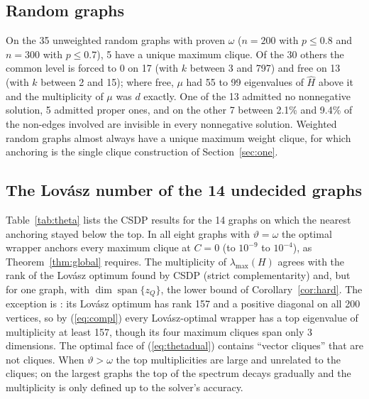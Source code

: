 \documentclass[11pt]{article}
\theoremstyle{definition}
\theoremstyle{remark}
\newcommand{\hH}{\hat{H}}
\newcommand{\lmax}{\lambda_{\max}}
\newcommand{\gr}[1]{\texttt{\detokenize{#1}}}
\DeclareMathOperator{\spn}{span}
\begin{document}
\subsection{Random graphs}

On the 35 unweighted random graphs with proven $\omega$ ($n=200$ with
$p\leq0.8$ and $n=300$ with $p\leq0.7$), 5 have a unique maximum clique. Of
the 30 others the common level is forced to $0$ on 17 (with $k$ between 3
and 797) and free on 13 (with $k$ between 2 and 15); where free, $\mu$ had
55 to 99 eigenvalues of $\hH$ above it and the multiplicity of $\mu$ was $d$
exactly. One of the 13 admitted no nonnegative solution, 5 admitted proper
ones, and on the other 7 between 2.1\% and 9.4\% of the non-edges involved
are invisible in every nonnegative solution. Weighted random graphs almost always have a unique maximum weight
clique, for which anchoring is the single clique construction of
Section~\ref{sec:one}.

\subsection{The Lov\'asz number of the 14 undecided graphs}

Table~\ref{tab:theta} lists the CSDP results for the 14 graphs on which the
nearest anchoring stayed below the top. In all eight graphs with
$\vartheta=\omega$ the optimal wrapper anchors every maximum clique at $C=0$
(to $10^{-9}$ to $10^{-4}$), as Theorem~\ref{thm:global} requires. The
multiplicity of $\lmax(H)$ agrees with the rank of the Lov\'asz optimum found
by CSDP (strict complementarity) and, but for one graph, with
$\dim\spn\{z_Q\}$, the lower bound of Corollary~\ref{cor:hard}. The
exception is \gr{gen200_p0.9_44}: its Lov\'asz optimum has rank 157 and a
positive diagonal on all 200 vertices, so by (\ref{eq:compl}) every
Lov\'asz-optimal wrapper has a top eigenvalue of multiplicity at least 157,
though its four maximum cliques span only 3 dimensions. The optimal face of
(\ref{eq:thetadual}) contains ``vector cliques'' that are not cliques. When
$\vartheta>\omega$ the top multiplicities are large and unrelated to the
cliques; on the largest graphs the top of the spectrum decays gradually and
the multiplicity is only defined up to the solver's accuracy.
\end{document}
